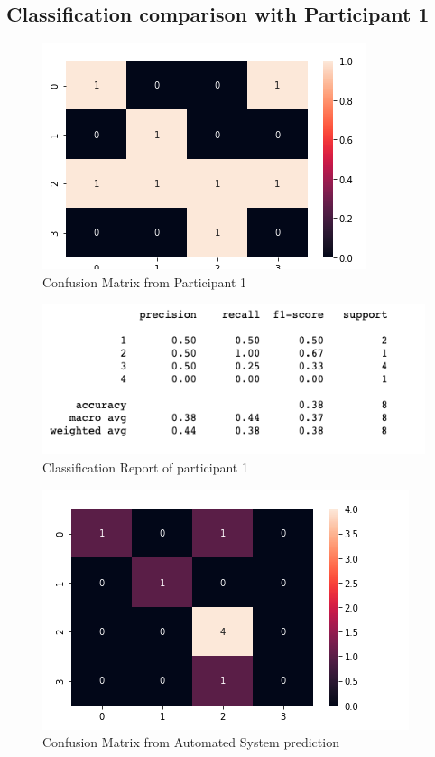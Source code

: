 
\subsection*{Classification comparison with Participant 1 }

\begin{figure}[!htp]
    \includegraphics[width=\textwidth]{Images/p1.png}
    \caption{Confusion Matrix from Participant 1}
    \label{fig:f11}
\end{figure}

\begin{figure}[!htp]
    \includegraphics[width=\textwidth]{Images/p1r.png}
    \caption{Classification Report of participant 1}
    \label{fig:f11}
\end{figure}

\pagebreak

\begin{figure}[!htp]
    \includegraphics[width=\textwidth]{Images/a1.png}
    \caption{Confusion Matrix from Automated System prediction}
    \label{fig:f11}
\end{figure}

